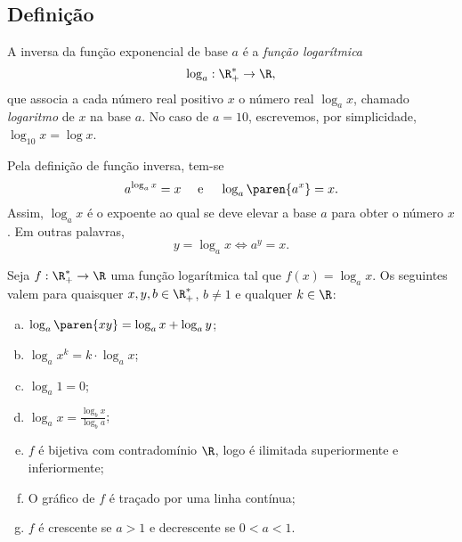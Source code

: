 \subsection{Definição}

\begin{definition}
A inversa da função exponencial de base $a$ é a \emph{função
logarítmica}
$$\log_a : \R_+^* \to \R,$$
que associa a cada número real positivo $x$ o número real $\log_a
x$, chamado \emph{logaritmo} de $x$ na base $a$. No caso de $a=10$,
escrevemos, por simplicidade, $\log_{10}x = \log x$.
\end{definition}

\begin{remark}
	Pela definição de função inversa, tem-se
$$ a^{\log_a x}=x \ \ \ \text{ e } \ \ \ \log_a \paren{a^x} = x.$$
Assim, $\log_a x $ é o expoente ao qual se deve elevar a base $a$
para obter o número $x$. Em outras palavras,
$$ y = \log_a x \iff a^y = x.$$
\end{remark}

\begin{proposition}
	Seja $f: \R_+^* \to \R$ uma função logarítmica tal que $f(x) =
\log_a x$. Os seguintes valem para quaisquer  $x, y, b \in
\R_+^*$, $b \neq 1$ e qualquer $k \in \R$:
\begin{enumerate}[(a)]
  \item $\log_a \paren{xy} = \log_a x + \log_a y$;
  \item $\log_a x^k = k\cdot \log_a x$;
  \item $\log_a 1 = 0$;
  \item $\log_a x = \frac{\log_b x}{\log_b a}$;
  \item $f$ é bijetiva com contradomínio $\R$, logo é ilimitada superiormente e inferiormente;
  \item O gráfico de $f$ é traçado por uma linha contínua;
  \item $f$ é crescente se $a>1$ e decrescente se $0<a<1$.
\end{enumerate}
\end{proposition}

